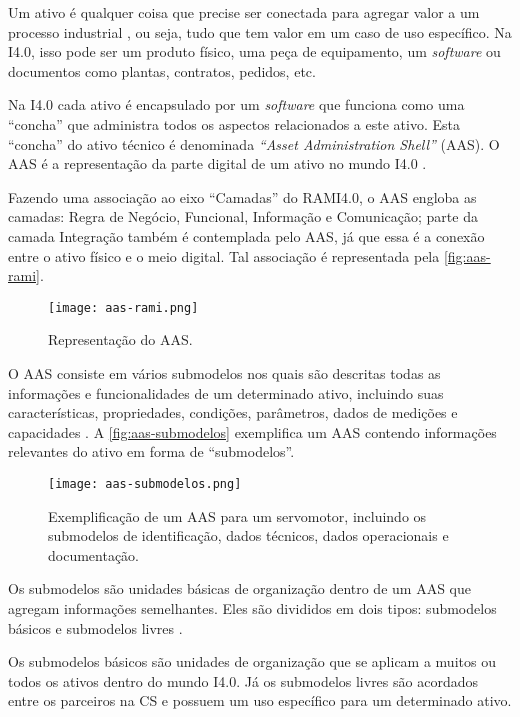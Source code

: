Um ativo é qualquer coisa que precise ser conectada para agregar valor a um processo industrial \cite{bader2019aas}, ou seja, tudo que tem valor em um caso de uso específico. Na I4.0, isso pode ser um produto físico, uma peça de equipamento, um \textit{software} ou documentos como plantas, contratos, pedidos, etc.

Na I4.0 cada ativo é encapsulado por um \textit{software} que funciona como uma ``concha'' que administra todos os aspectos relacionados a este ativo. Esta ``concha'' do ativo técnico é denominada \textit{``Asset Administration Shell''} (AAS). O AAS é a representação da parte digital de um ativo no mundo I4.0 \cite{ye2019aas}.

Fazendo uma associação ao eixo ``Camadas'' do RAMI4.0, o AAS engloba as camadas: Regra de Negócio, Funcional, Informação e Comunicação; parte da camada Integração também é contemplada pelo AAS, já que essa é a conexão entre o ativo físico e o meio digital. Tal associação é representada pela \autoref{fig:aas-rami}.

\begin{figure}[htb]
	\centering
	\texttt{[image: aas-rami.png]}
	\caption{Representação do AAS.}
	\label{fig:aas-rami}
\end{figure}

O AAS consiste em vários submodelos nos quais são descritas todas as informações e funcionalidades de um determinado ativo, incluindo suas características, propriedades, condições, parâmetros, dados de medições e capacidades \cite{bader2019aas}. A \autoref{fig:aas-submodelos} exemplifica um AAS contendo informações relevantes do ativo em forma de ``submodelos''.

\begin{figure}[htb]
	\centering
	\texttt{[image: aas-submodelos.png]}
	\caption{Exemplificação de um AAS para um servomotor, incluindo os submodelos de identificação, dados técnicos, dados operacionais e documentação.}
	\label{fig:aas-submodelos}
\end{figure}

Os submodelos são unidades básicas de organização dentro de um AAS que agregam informações semelhantes. Eles são divididos em dois tipos: submodelos básicos e submodelos livres \cite{bader2019aasimplementation}.

Os submodelos básicos são unidades de organização que se aplicam a muitos ou todos os ativos dentro do mundo I4.0. Já os submodelos livres são acordados entre os parceiros na CS e possuem um uso específico para um determinado ativo.

